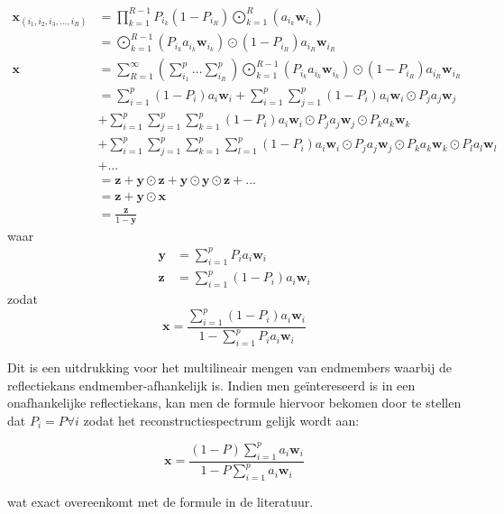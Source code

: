 \documentclass[12pt]{report}
\DeclareMathOperator*{\Odot}{\bigodot}
\begin{document}
\begin{align}
\bm{x}_{(i_1,i_2,i_3,...,i_R)} &= \prod_{k=1}^{R-1}P_{i_k} (1-P_{i_R}) \Odot_{k=1}^R \left(a_{i_k} \bm{w}_{i_k}\right) \\
&= \Odot_{k=1}^{R-1} \left(P_{i_k}a_{i_k} \bm{w}_{i_k}\right) \odot (1-P_{i_R}) a_{i_R} \bm{w}_{i_R} \\
\bm{x} &= \sum_{R=1}^{\infty} \left(\sum_{i_1}^{p} ... \sum_{i_R}^{p}\right) \Odot_{k=1}^{R-1} \left(P_{i_k}a_{i_k} \bm{w}_{i_k}\right) \odot (1-P_{i_R}) a_{i_R} \bm{w}_{i_R} \\
&= \sum_{i=1}^p (1-P_i) a_{i} \bm{w}_{i} + \sum_{i=1}^p \sum_{j=1}^p (1-P_i) a_{i} \bm{w}_{i} \odot P_j a_{j} \bm{w}_{j} \nonumber\\&+ \sum_{i=1}^p \sum_{j=1}^p \sum_{k=1}^p (1-P_i) a_{i} \bm{w}_{i} \odot P_j a_{j} \bm{w}_{j} \odot P_k a_{k} \bm{w}_{k} \nonumber\\&+ \sum_{i=1}^p \sum_{j=1}^p \sum_{k=1}^p  \sum_{l=1}^p (1-P_i) a_{i} \bm{w}_{i} \odot P_j a_{j} \bm{w}_{j} \odot P_k a_{k} \bm{w}_{k} \odot P_l a_{l} \bm{w}_{l} \nonumber \\& + ... \\
&= \bm{z} + \bm{y}\odot\bm{z} + \bm{y}\odot\bm{y}\odot\bm{z} + ... \\
&= \bm{z} + \bm{y}\odot\bm{x} \\
 &= \frac{\bm{z}}{1-\bm{y}}
\end{align}
waar
\begin{align}
\bm{y} &= \sum_{i=1}^p P_i a_{i} \bm{w}_{i} \\
\bm{z} &= \sum_{i=1}^p (1-P_i) a_{i} \bm{w}_{i} 
\end{align}
zodat
\begin{equation}
\bm{x} = \frac{\sum_{i=1}^p (1-P_i) a_{i} \bm{w}_{i}}{1-\sum_{i=1}^p P_i a_{i} \bm{w}_{i}} \label{eq:Pi}
\end{equation}

Dit is een uitdrukking voor het multilineair mengen van endmembers waarbij de reflectiekans endmember-afhankelijk is. Indien men ge\"intereseerd is in een onafhankelijke reflectiekans, kan men de formule hiervoor bekomen door te stellen dat $P_i = P \forall i$ zodat het reconstructiespectrum gelijk wordt aan:

\begin{equation}
\bm{x} = \frac{(1-P) \sum_{i=1}^p a_{i} \bm{w}_{i}}{1-P\sum_{i=1}^p  a_{i} \bm{w}_{i}} \label{eq:P}
\end{equation}

wat exact overeenkomt met de formule in de literatuur\cite{mlinmix}.
\end{document}
